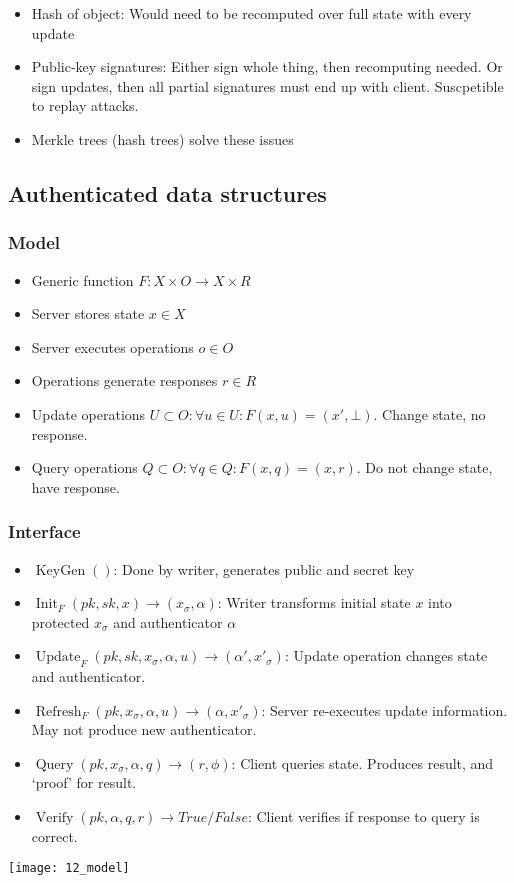 \begin{itemize}
		\item Hash of object: Would need to be recomputed over full state with every update
		\item Public-key signatures: Either sign whole thing, then recomputing
				needed. Or sign updates, then all partial signatures must end
				up with client. Suscpetible to replay attacks.
		\item Merkle trees (hash trees) solve these issues
\end{itemize}

\subsection{Authenticated data structures}

\subsubsection{Model}

\begin{itemize}
		\item Generic function $F : X \times O \rightarrow X \times R$
		\item Server stores state $x \in X$
		\item Server executes operations $o \in O$
		\item Operations generate responses $r \in R$
		\item Update operations $U \subset O : \forall u \in U : F(x, u) = (x', \bot)$. Change state, no response.
		\item Query operations $Q \subset O : \forall q \in Q : F(x, q) = (x, r)$. Do not change state, have response.
\end{itemize}

\subsubsection{Interface}

\begin{itemize}
		\item $\operatorname{KeyGen}()$: Done by writer, generates public and secret key
		\item $\operatorname{Init}_F(pk, sk, x) \rightarrow (x_\sigma, \alpha)$: Writer
				transforms initial state $x$ into protected $x_\sigma$ and
				authenticator $\alpha$
		\item $\operatorname{Update}_F(pk, sk, x_\sigma, \alpha, u) \rightarrow
				(\alpha', x'_\sigma)$: Update operation changes state and
				authenticator.
		\item $\operatorname{Refresh}_F(pk, x_\sigma, \alpha, u) \rightarrow (\alpha,
				x'_\sigma)$: Server re-executes update information. May not
				produce new authenticator.
		\item $\operatorname{Query}(pk, x_\sigma, \alpha, q) \rightarrow (r,
				\phi)$: Client queries state. Produces result, and `proof' for
				result.
		\item $\operatorname{Verify}(pk, \alpha, q, r) \rightarrow True/False$:
				Client verifies if response to query is correct.
\end{itemize}

\texttt{[image: 12\_model]}
